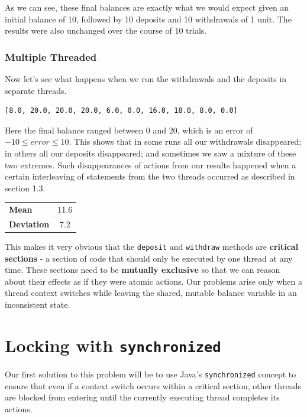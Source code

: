 \documentclass[a4paper,12pt]{kth-mag}
\begin{document}
As we can see, these final balances are exactly what we would expect given an initial balance of 10, followed by 10 deposits and 10 withdrawals of 1 unit. The results were also unchanged over the course of 10 trials.

\subsubsection{Multiple Threaded}

Now let's see what happens when we run the withdrawals and the deposits in separate threads. 

\begin{listing}[H]
	\begin{verbatim}
[8.0, 20.0, 20.0, 20.0, 6.0, 0.0, 16.0, 18.0, 8.0, 0.0]
	\end{verbatim}
\end{listing}

Here the final balance ranged between 0 and 20, which is an error of $-10 \leq error \leq 10$. This shows that in some runs all our withdrawals disappeared; in others all our deposits disappeared; and sometimes we saw a mixture of these two extremes. Such disappearances of actions from our results happened when a certain interleaving of statements from the two threads occurred as described in section 1.3.

\begin{table}[h]
    \centering
    \begin{tabular}{lc}    
    \textbf{Mean} & 11.6 \\
    \textbf{Deviation} & 7.2 \\ 
    \end{tabular}
\end{table}

This makes it very obvious that the \texttt{deposit} and \texttt{withdraw} methods are \textbf{critical sections} - a section of code that should only be executed by one thread at any time. These sections need to be \textbf{mutually exclusive} so that we can reason about their effects as if they were atomic actions. Our problems arise only when a thread context switches while leaving the shared, mutable balance variable in an inconsistent state. 

\section{Locking with \texttt{synchronized}}

Our first solution to this problem will be to use Java's \texttt{synchronized} concept to ensure that even if a context switch occurs within a critical section, other threads are blocked from entering until the currently executing thread completes its actions.
\end{document}
